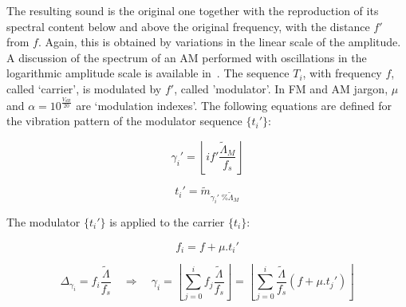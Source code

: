 
The resulting sound is the original one together with the
reproduction of its spectral content below and above the original frequency, with the distance $f'$ from $f$. Again, this is obtained by variations in the linear scale of the amplitude. A discussion of the
spectrum of an AM performed with oscillations in the logarithmic amplitude scale is available in~\cite{dissertacao}. The sequence $T_i$, with frequency $f$, called `carrier', is modulated by
$f'$, called 'modulator'. In FM and AM jargon, $\mu$ and
$\alpha=10^{\frac{V_{dB}}{20}}$ are `modulation indexes'. The following equations are defined for the vibration pattern of the modulator sequence $\{t_i'\}$:

\begin{equation}\label{fmGammaAux}
\gamma_i'=\left \lfloor i f' \frac{\widetilde{\Lambda}_M}{f_s} \right \rfloor
\end{equation}

\begin{equation}\label{fmAux}
t_i'=\widetilde{m}_{\gamma_i' \;\% \widetilde{\Lambda}_M}
\end{equation}

The modulator $\{t_i'\}$ is applied to the carrier $\{t_i\}$:

\begin{equation}\label{fmF}
f_i=f + \mu . t_i'
\end{equation}

\begin{equation}\label{fmGamma}
\Delta_{\gamma_i}=f_i\frac{\widetilde{\Lambda}}{f_s} \quad \Rightarrow \quad \gamma_i = \left \lfloor \sum_{j=0}^{i} f_j \frac{\widetilde{\Lambda}}{f_s} \right \rfloor = \left \lfloor \sum_{j=0}^{i} \frac{\widetilde{\Lambda}}{f_s}(f+\mu . t_j') \right\rfloor
\end{equation}


